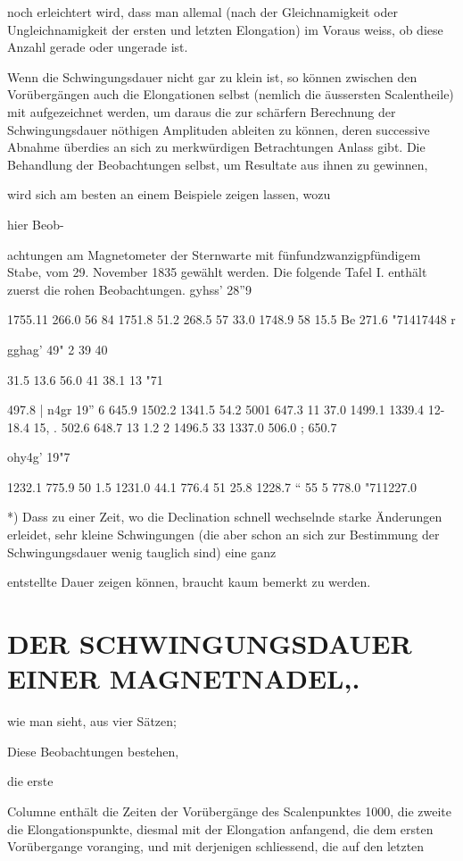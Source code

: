 \documentclass[12pt,a4paper]{article}
\begin{document}
noch erleichtert wird, dass man allemal (nach der Gleichnamigkeit oder Ungleichnamigkeit der ersten und letzten Elongation) im Voraus weiss, ob diese Anzahl gerade oder ungerade ist.

Wenn die Schwingungsdauer nicht gar zu klein ist, so können zwischen den Vorübergängen auch die Elongationen selbst (nemlich die äussersten Scalentheile) mit aufgezeichnet werden, um daraus die zur schärfern Berechnung der Schwingungsdauer nöthigen Amplituden ableiten zu können, deren successive Abnahme überdies an sich zu merkwürdigen Betrachtungen Anlass gibt. Die Behandlung der Beobachtungen selbst, um Resultate aus ihnen zu gewinnen,

wird sich am besten an einem Beispiele zeigen lassen, wozu

hier Beob-

achtungen am Magnetometer der Sternwarte mit fünfundzwanzigpfündigem Stabe, vom 29. November 1835 gewählt werden. Die folgende Tafel I. enthält zuerst die rohen Beobachtungen. gyhss’ 28”9

1755.11 266.0 56 84 1751.8 51.2 268.5 57 33.0 1748.9 58 15.5 Be 271.6 "71417448 r

gghag’ 49" 2 39 40

31.5 13.6 56.0 41 38.1 13 "71

497.8 | n4gr 19” 6 645.9 1502.2 1341.5 54.2 5001 647.3 11 37.0 1499.1 1339.4 12-18.4 15, . 502.6 648.7 13 1.2 2 1496.5 33 1337.0 506.0 ; 650.7

ohy4g’ 19"7

1232.1 775.9 50 1.5 1231.0 44.1 776.4 51 25.8 1228.7 “ 55 5 778.0 "711227.0

*) Dass zu einer Zeit, wo die Declination schnell wechselnde starke Änderungen erleidet, sehr kleine Schwingungen (die aber schon an sich zur Bestimmung der Schwingungsdauer wenig tauglich sind) eine ganz

entstellte Dauer zeigen können, braucht kaum bemerkt zu werden.

\section*{DER SCHWINGUNGSDAUER EINER MAGNETNADEL,.}
wie man sieht, aus vier Sätzen;

Diese Beobachtungen bestehen,

die erste

Columne enthält die Zeiten der Vorübergänge des Scalenpunktes 1000, die zweite die Elongationspunkte, diesmal mit der Elongation anfangend, die dem ersten Vorübergange voranging, und mit derjenigen schliessend, die auf den letzten
\end{document}
